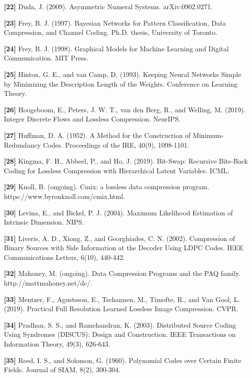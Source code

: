 \documentclass[
]{article}
\begin{document}
\textbf{{[}22{]}} Duda, J. (2009). Asymmetric Numeral Systems.
arXiv:0902.0271.

\textbf{{[}23{]}} Frey, B. J. (1997). Bayesian Networks for Pattern
Classification, Data Compression, and Channel Coding. Ph.D. thesis,
University of Toronto.

\textbf{{[}24{]}} Frey, B. J. (1998). Graphical Models for Machine
Learning and Digital Communication. MIT Press.

\textbf{{[}25{]}} Hinton, G. E., and van Camp, D. (1993). Keeping Neural
Networks Simple by Minimizing the Description Length of the Weights.
Conference on Learning Theory.

\textbf{{[}26{]}} Hoogeboom, E., Peters, J. W. T., van den Berg, R., and
Welling, M. (2019). Integer Discrete Flows and Lossless Compression.
NeurIPS.

\textbf{{[}27{]}} Huffman, D. A. (1952). A Method for the Construction
of Minimum-Redundancy Codes. Proceedings of the IRE, 40(9), 1098-1101.

\textbf{{[}28{]}} Kingma, F. H., Abbeel, P., and Ho, J. (2019).
Bit-Swap: Recursive Bits-Back Coding for Lossless Compression with
Hierarchical Latent Variables. ICML.

\textbf{{[}29{]}} Knoll, B. (ongoing). Cmix: a lossless data compression
program. https://www.byronknoll.com/cmix.html.

\textbf{{[}30{]}} Levina, E., and Bickel, P. J. (2004). Maximum
Likelihood Estimation of Intrinsic Dimension. NIPS.

\textbf{{[}31{]}} Liveris, A. D., Xiong, Z., and Georghiades, C. N.
(2002). Compression of Binary Sources with Side Information at the
Decoder Using LDPC Codes. IEEE Communications Letters, 6(10), 440-442.

\textbf{{[}32{]}} Mahoney, M. (ongoing). Data Compression Programs and
the PAQ family. http://mattmahoney.net/dc/.

\textbf{{[}33{]}} Mentzer, F., Agustsson, E., Tschannen, M., Timofte,
R., and Van Gool, L. (2019). Practical Full Resolution Learned Lossless
Image Compression. CVPR.

\textbf{{[}34{]}} Pradhan, S. S., and Ramchandran, K. (2003).
Distributed Source Coding Using Syndromes (DISCUS): Design and
Construction. IEEE Transactions on Information Theory, 49(3), 626-643.

\textbf{{[}35{]}} Reed, I. S., and Solomon, G. (1960). Polynomial Codes
over Certain Finite Fields. Journal of SIAM, 8(2), 300-304.
\end{document}
